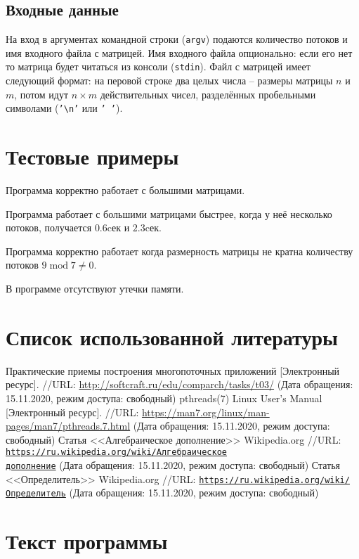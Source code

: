 \documentclass[a4paper]{article}
\begin{document}
  \subsection{Входные данные}
  На вход в аргументах командной строки (\texttt{argv}) подаются количество потоков и имя входного файла с матрицей.
  Имя входного файла опционально: если его нет то матрица будет читаться из консоли (\texttt{stdin}).
  Файл с матрицей имеет следующий формат: на перовой строке два целых числа -- размеры матрицы $n$ и $m$,
  потом идут $n \times m$ действительных чисел, разделённых пробельными символами (\texttt{'\textbackslash{}n'} или \texttt{' '}).

  \newpage
  \section{Тестовые примеры}
  Программа корректно работает с большими матрицами. 

  Программа работает с большими матрицами быстрее, когда у неё несколько потоков, получается $0.6$cек и $2.3$cек. 

  Программа корректно работает когда размерность матрицы не кратна количеству потоков $9 \operatorname{mod} 7 \neq 0$. 

  В программе отсутствуют утечки памяти. 

  \newpage
  \section{Список использованной литературы}
  \begin{thebibliography}{3}
     Практические приемы построения многопоточных приложений [Электронный ресурс].
      //URL: \url{http://softcraft.ru/edu/comparch/tasks/t03/} (Дата обращения: 15.11.2020, режим доступа: свободный)
     pthreads(7) Linux User's Manual [Электронный ресурс].
      //URL: \url{https://man7.org/linux/man-pages/man7/pthreads.7.html} (Дата обращения: 15.11.2020, режим доступа: свободный)
     Статья <<Алгебраическое дополнение>> Wikipedia.org
      //URL: \href{https://ru.wikipedia.org/wiki/%D0%90%D0%BB%D0%B3%D0%B5%D0%B1%D1%80%D0%B0%D0%B8%D1%87%D0%B5%D1%81%D0%BA%D0%BE%D0%B5_%D0%B4%D0%BE%D0%BF%D0%BE%D0%BB%D0%BD%D0%B5%D0%BD%D0%B8%D0%B5}
      {\texttt{https://ru.wikipedia.org/wiki/Алгебраическое\\\-дополнение}}
      (Дата обращения: 15.11.2020, режим доступа: свободный)
     Статья <<Определитель>> Wikipedia.org
      //URL: \href{https://ru.wikipedia.org/wiki/%D0%9E%D0%BF%D1%80%D0%B5%D0%B4%D0%B5%D0%BB%D0%B8%D1%82%D0%B5%D0%BB%D1%8C}
      {\texttt{https://ru.wikipedia.org/wiki/Определитель}}
      (Дата обращения: 15.11.2020, режим доступа: свободный)
  \end{thebibliography}

  \newpage
  \section{Текст программы}
  
\end{document}
